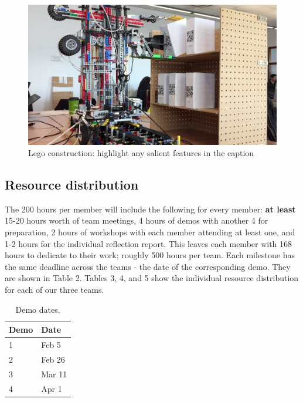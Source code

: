 \documentclass{article}
\begin{document}
\begin{figure}[tb]
\vskip 5mm
\begin{center}
\centerline{\includegraphics[width=\columnwidth]{figs/crane}}
\caption{Lego construction: highlight any salient features in the caption}
\label{fig:sample-fig}
\end{center}
\vskip -5mm
\end{figure} 


\subsection{Resource distribution}

The 200 hours per member will include the following for every member: {\bf at least} 15-20 hours worth of team meetings, 4 hours of demos with another 4 for preparation, 2 hours of workshops with each member attending at least one, and 1-2 hours for the individual reflection report. This leaves each member with 168 hours to dedicate to their work; roughly 500 hours per team. Each milestone has the same deadline across the teams - the date of the corresponding demo. They are shown in Table 2. Tables 3, 4, and 5 show the individual resource distribution for each of our three teams.
\begin{table}[]
  \begin{center}
  \begin{tabular}{ll}
    \hline
    Demo & Date   \\
    \hline
    1 & Feb 5 \\
    2 & Feb 26 \\
    3 & Mar 11 \\
    4 & Apr 1\\ \hline
  \end{tabular}
  \end{center}
  \caption{Demo dates.}
\end{table}
\end{document}
